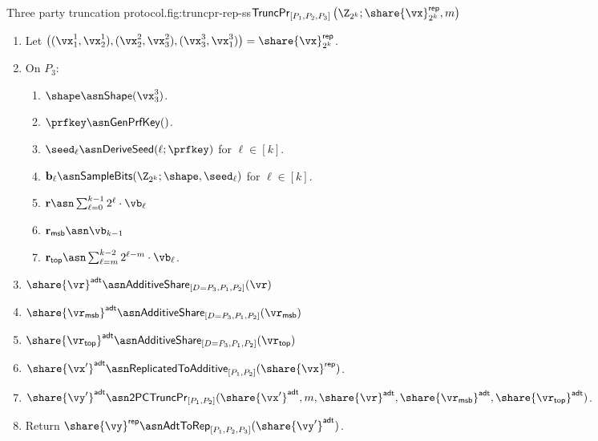 \begin{Boxfig}{Three party truncation protocol.}{fig:truncpr-rep-ss}{$\mathsf{TruncPr}_{[P_1, P_2, P_3]} \left(\Z_{2^k}; \share{\vx}^{\mathsf{rep}}_{2^k}, m \right)$}
\begin{enumerate}
  \item Let $\left( (\vx_1^1, \vx_2^1), (\vx_2^2, \vx_3^2), (\vx_3^3, \vx_1^3) \right) = \share{\vx}^{\mathsf{rep}}_{2^k}$.

  \item On $P_3$:
  \begin{enumerate}
    \item $\shape \asn \mathsf{Shape}(\vx^3_3)$.
    \item $\prfkey \asn \mathsf{GenPrfKey}()$.
    \item $\seed_\ell \asn \mathsf{DeriveSeed}(\ell; \prfkey)$ for $\ell \in [k]$.
    \item $\mathbf{b}_\ell \asn \mathsf{SampleBits}(\Z_{2^k}; \shape, \seed_\ell)$ for $\ell \in [k]$.
    \item $\mathbf{r} \asn \sum_{\ell=0}^{k-1}2^\ell \cdot \vb_\ell$
    \item $\mathbf{r}_{\mathsf{msb}} \asn \vb_{k-1}$
    \item $\mathbf{r}_{\mathsf{top}} \asn \sum_{\ell=m}^{k-2} 2^{\ell-m} \cdot \vb_\ell$.
  \end{enumerate}

  \item $\share{\vr}^{\mathsf{adt}} \asn \mathsf{AdditiveShare}_{[D=P_3, P_1, P_2]}(\vr)$

  \item $\share{\vr_{\mathsf{msb}}}^{\mathsf{adt}} \asn \mathsf{AdditiveShare}_{[D=P_3, P_1, P_2]}(\vr_{\mathsf{msb}})$

  \item $\share{\vr_{\mathsf{top}}}^{\mathsf{adt}} \asn \mathsf{AdditiveShare}_{[D=P_3, P_1, P_2]}(\vr_{\mathsf{top}})$

  \item $\share{\vx'}^{\mathsf{adt}} \asn \mathsf{ReplicatedToAdditive}_{[P_1, P_2]}(\share{\vx}^{\mathsf{rep}})$.

  \item $\share{\vy'}^{\mathsf{adt}} \asn \mathsf{2PCTruncPr}_{[P_1, P_2]}(\share{\vx'}^{\mathsf{adt}}, m, \share{\vr}^{\mathsf{adt}}, \share{\vr_{\mathsf{msb}}}^{\mathsf{adt}}, \share{\vr_{\mathsf{top}}}^{\mathsf{adt}} )$.

  \item Return $\share{\vy}^{\mathsf{rep}} \asn \mathsf{AdtToRep}_{[P_1, P_2, P_3]}(\share{\vy'}^{\mathsf{adt}})$.


\end{enumerate}
\end{Boxfig}
